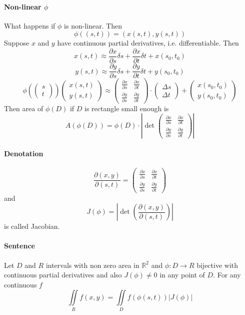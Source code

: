 \paragraph{Non-linear $\phi$}
What happens if $\phi$ is non-linear. Then 
$$\phi((s,t)) = \left(x(s,t), y(s,t)\right)$$
Suppose $x$ and $y$ have continuous partial derivatives, i.e. differentiable. Then 
$$x(s,t) \approx \frac{\partial x}{\partial s}\delta s + \frac{\partial x}{\partial t}\delta t+x(s_0,t_0)$$
$$y(s,t) \approx \frac{\partial y}{\partial s}\delta s + \frac{\partial y}{\partial t}\delta t+y(s_0,t_0)$$
$$\phi\left(\begin{pmatrix}s\\t\end{pmatrix}\right)\begin{pmatrix}x(s,t)\\y(s,t)\end{pmatrix} \approx \begin{pmatrix}\frac{\partial x}{\partial s}&\frac{\partial x}{\partial t}\\\frac{\partial y}{\partial s}&\frac{\partial y}{\partial t}\end{pmatrix}\cdot \begin{pmatrix}\Delta s\\\Delta t\end{pmatrix} + \begin{pmatrix} x(s_0,t_0)\\y(s_0,t_0)\end{pmatrix}$$
Then area of $\phi(D)$ if $D$ is rectangle small enough  is
$$A(\phi(D)) = \phi(D) \cdot \left| \det \begin{pmatrix}\frac{\partial x}{\partial s}&\frac{\partial x}{\partial t}\\\frac{\partial y}{\partial s}&\frac{\partial y}{\partial t}\end{pmatrix} \right|$$
\paragraph{Denotation} 
$$\frac{\partial (x,y)}{\partial (s,t)} = \begin{pmatrix}\frac{\partial x}{\partial s}&\frac{\partial x}{\partial t}\\\frac{\partial y}{\partial s}&\frac{\partial y}{\partial t}\end{pmatrix}$$
and
$$J(\phi) = \left|\det \left( \frac{\partial (x,y)}{\partial (s,t)} \right)\right|$$
is called Jacobian.
\paragraph{Sentence}
Let $D$ and $R$ intervals with non zero area in $\mathbb{R}^2$ and $\phi: D \to R$ bijective with continuous partial derivatives and also $J(\phi) \neq 0$ in any point of $D$. For any continuous $f$
$$\iint\limits_{R} f(x,y) = \iint\limits_{D} f(\phi(s,t)) |J(\phi)|$$

